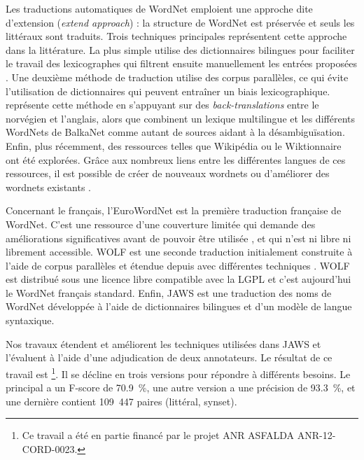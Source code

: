 Les traductions automatiques de WordNet emploient une approche dite d'extension (\textit{extend approach}) : la structure de WordNet est préservée et seuls les littéraux sont traduits. Trois techniques principales représentent cette approche dans la littérature. La plus simple utilise des dictionnaires bilingues pour faciliter le travail des lexicographes qui filtrent ensuite manuellement les entrées proposées \citep{vossen1998eurowordnet,pianta2002developing,tufis2004balkanet}. Une deuxième méthode de traduction utilise des corpus parallèles, ce qui évite l'utilisation de dictionnaires qui peuvent entraîner un biais lexicographique. \cite{dyvik2004translations} représente cette méthode en s'appuyant sur des \textit{back-translations} entre le norvégien et l'anglais, alors que \citep{sagot2008construction} combinent un lexique multilingue et les différents WordNets de BalkaNet comme autant de sources aidant à la désambiguïsation. Enfin, plus récemment, des ressources telles que Wikipédia ou le Wiktionnaire ont été explorées. Grâce aux nombreux liens entre les différentes langues de ces ressources, il est possible de créer de nouveaux wordnets \citep{melo2009towards,navigli2010babelnet} ou d'améliorer des wordnets existants \citep{hanoka2012wordnet}.

Concernant le français, l'EuroWordNet \citep{vossen1998eurowordnet} est la première traduction française de WordNet. C'est une ressource d'une couverture limitée qui demande des améliorations significatives avant de pouvoir être utilisée \citep{jacquin2006systemes}, et qui n'est ni libre ni librement accessible. WOLF est une seconde traduction initialement construite à l'aide de corpus parallèles \citep{sagot2008construction} et étendue depuis avec différentes techniques \citep{apidianaki2012applying}. WOLF est distribué sous une licence libre compatible avec la LGPL et c'est aujourd'hui le WordNet français standard. Enfin, JAWS \citep{mouton2010jaws} est une traduction des noms de WordNet développée à l'aide de dictionnaires bilingues et d'un modèle de langue syntaxique.

Nos travaux étendent et améliorent les techniques utilisées dans JAWS et l'évaluent à l'aide d'une adjudication de deux annotateurs. Le résultat de ce travail est \newjaws{}\footnote{Ce travail a été en partie financé par le projet ANR ASFALDA ANR-12-CORD-0023.}. Il se décline en trois versions pour répondre à différents besoins. Le \newjaws{} principal a un F-score de 70.9~\%, une autre version a une précision de 93.3~\%, et une dernière contient 109~447 paires (littéral, synset).

